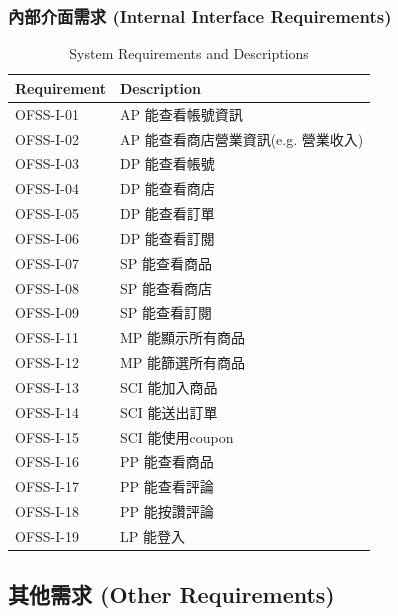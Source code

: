 \documentclass[a4paper, 12pt]{article}
\begin{document}
\subsubsection{內部介面需求 (Internal Interface Requirements)}
\begin{table}[h]
    \centering
    \renewcommand{\arraystretch}{1.35}
    \begin{tabular}{|p{3cm}|p{10cm}|}
        \hline
        \textbf{Requirement} & \textbf{Description} \\
        \hline
        OFSS-I-01 & AP 能查看帳號資訊 \\
        \hline
        OFSS-I-02 & AP 能查看商店營業資訊(e.g. 營業收入)  \\
        \hline
        OFSS-I-03 & DP 能查看帳號 \\
        \hline
        OFSS-I-04 & DP 能查看商店 \\
        \hline
        OFSS-I-05 & DP 能查看訂單 \\
        \hline
        OFSS-I-06 & DP 能查看訂閱 \\
        \hline
        OFSS-I-07 & SP 能查看商品 \\
        \hline
        OFSS-I-08 & SP 能查看商店 \\
        \hline
        OFSS-I-09 & SP 能查看訂閱 \\
        \hline
        OFSS-I-11 & MP 能顯示所有商品 \\
        \hline
        OFSS-I-12 & MP 能篩選所有商品 \\
        \hline
        OFSS-I-13 & SCI 能加入商品 \\
        \hline
        OFSS-I-14 & SCI 能送出訂單 \\
        \hline
        OFSS-I-15 & SCI 能使用coupon \\
        \hline
        OFSS-I-16 & PP 能查看商品 \\
        \hline
        OFSS-I-17 & PP 能查看評論 \\
        \hline
        OFSS-I-18 & PP 能按讚評論 \\
        \hline
        OFSS-I-19 & LP 能登入 \\
        \hline
    \end{tabular}
    \caption{System Requirements and Descriptions}
    \label{tab:system-requirements}
\end{table}

\subsection{其他需求 (Other Requirements)}
\end{document}
